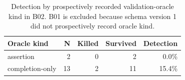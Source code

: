 \begin{table}[t]
\centering
\caption{Detection by prospectively recorded validation-oracle kind in B02. B01 is excluded because schema version 1 did not prospectively record oracle kind.}
\label{tab:rq2-oracle}
\begin{tabular}{lrrrr}
\toprule
Oracle kind & N & Killed & Survived & Detection \\
\midrule
assertion & 2 & 0 & 2 & 0.0\% \\
completion-only & 13 & 2 & 11 & 15.4\% \\
\bottomrule
\end{tabular}
\end{table}
